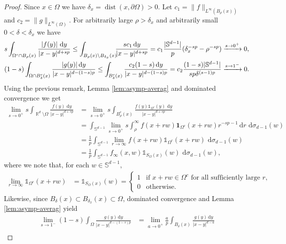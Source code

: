 \documentclass[12pt, reqno]{amsart}%
\theoremstyle{plain}  %
\theoremstyle{definition}  %
\theoremstyle{remark}
\numberwithin{equation}{section}
\DeclareMathOperator{\R}{\mathbb{R}}
\renewcommand{\d}{\,\mathrm{d}}
\begin{document}
\begin{proof}
Since $x\in \Omega$ we have $\delta_x=\operatorname{dist}(x,\partial\Omega)>0$. Let $c_1= \|f\|_{L^\infty(B_\rho(x))}$ and $c_2= \|g\|_{L^\infty(\Omega)}$. For arbitrarily  large $\rho>\delta_x$ and arbitrarily small $0<\delta<\delta_x$ we have
\begin{align*}
&s \int_{ \Omega^c\cap B_\rho(x)}
\frac{|f(y)|\, \d y}{|x-y|^{d+sp}} \leq
\int_{B_\rho(x)\setminus B_{\delta_x}(x)}
\hspace{-1ex} \frac{s c_1\d y}{|x-y|^{d+sp}}
= c_1\frac{|\mathbb{S}^{d-1}|}{p} (\delta_x^{-sp}
-\rho^{-sp})\xrightarrow{s\to 0^+}0,\\
&(1-s) \int_{\Omega\cap B^c_{\delta} (x)}
\frac{ |g(y)|\d y}{|x-y|^{d-(1-s)p}} \leq  \int_{B^c_\delta(x)} \frac{c_2(1-s)\d y}{|x-y|^{d-(1-s)p}}
= c_2\frac{  (1-s) |\mathbb{S}^{d-1}|}{sp \delta^{(s-1)p}}
\xrightarrow{s\to 1^-}0. 
\end{align*}
Using  the previous remark, Lemma \ref{lem:asymp-averag}  and dominated convergence we get
\begin{align*}
\lim_{s \to 0^+}s \int_{\R^d \setminus \Omega} \frac{ f(y)\, \d y}{|x-y|^{d+sp}}
&=\lim_{s \to 0^+}s \int_{B^c_\rho(x)} \frac{ f(y)\mathds{1}_{\Omega^c}(y)\, \d y}{|x-y|^{d+sp}} \\
&=  \int_{\mathbb{S}^{d-1}}
 \lim_{s\to 0^+}s\int_\rho^\infty
f(x + rw)\mathbf{1}_{\Omega^c}(x + rw)
r^{-sp-1}\d r \, \d\sigma_{d-1}(w)\\
&= \frac{1}{p} \int_{\mathbb{S}^{d-1}}\lim_{r\to \infty} f(x+rw) \mathds{1}_{\Omega^c}(x+rw)\,  \d\sigma_{d-1}(w)\\
&=\frac{1}{p} \int_{\mathbb{S}^{d-1}}
f_\infty(x, w) \mathds{1}_{S_\Omega(x)}(w)\,  \d\sigma_{d-1}(w),
\end{align*}
where we note that, for each $w \in \mathbb{S}^{d-1}$,
\begin{align*}
\lim_{r\to \infty} \mathds{1}_{\Omega^c}(x+rw)&= \mathds{1}_{S_\Omega(x)} (w)=
\begin{cases}
1 & \text{if } x + rw \in \Omega^c \text{ for all sufficiently large } r, \\
0 & \text{otherwise}.
\end{cases}
\end{align*}
Likewise, since $B_\delta(x)\subset B_{\delta_x}(x)\subset \Omega$,  dominated convergence and  Lemma \ref{lem:asymp-averag} yield 
\begin{align*}
\lim_{s\to 1^-}(1-s) \int_{\Omega} \frac{ g(y)\d y}{|x-y|^{d-(1-s)p}}
&= \lim_{a \to 0^+}\frac{a}{p} \int_{B_{\delta} (x)} \frac{ g(y)\d y}{|x-y|^{d-a}} \\

\end{align*}
\end{proof}
\end{document}
